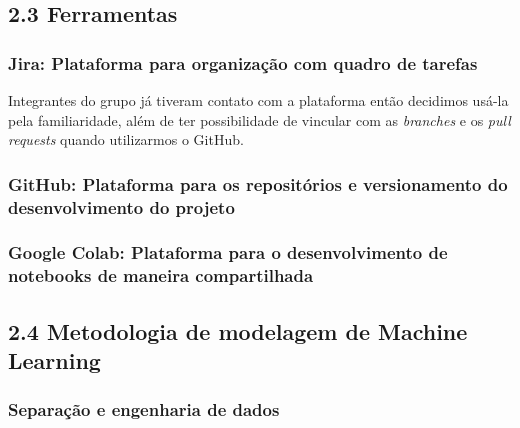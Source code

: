 \documentclass[
  brazilian,
  11pt,
]{article}
\begin{document}
\subsection{2.3 Ferramentas}\label{ferramentas}

\subsubsection{\texorpdfstring{\textbf{Jira:} Plataforma para organização com quadro de tarefas}{Jira: Plataforma para organização com quadro de tarefas}}\label{jira-plataforma-para-organizauxe7uxe3o-com-quadro-de-tarefas}

Integrantes do grupo já tiveram contato com a plataforma então decidimos usá-la pela familiaridade, além de ter possibilidade de vincular com as \emph{branches} e os \emph{pull requests} quando utilizarmos o GitHub.

\subsubsection{\texorpdfstring{\textbf{GitHub:} Plataforma para os repositórios e versionamento do desenvolvimento do projeto}{GitHub: Plataforma para os repositórios e versionamento do desenvolvimento do projeto}}\label{github-plataforma-para-os-reposituxf3rios-e-versionamento-do-desenvolvimento-do-projeto}

\subsubsection{\texorpdfstring{\textbf{Google Colab:} Plataforma para o desenvolvimento de notebooks de maneira compartilhada}{Google Colab: Plataforma para o desenvolvimento de notebooks de maneira compartilhada}}\label{google-colab-plataforma-para-o-desenvolvimento-de-notebooks-de-maneira-compartilhada}

\subsection{2.4 Metodologia de modelagem de Machine Learning}\label{metodologia-de-modelagem-de-machine-learning}

\subsubsection{Separação e engenharia de dados}\label{separauxe7uxe3o-e-engenharia-de-dados}
\end{document}
